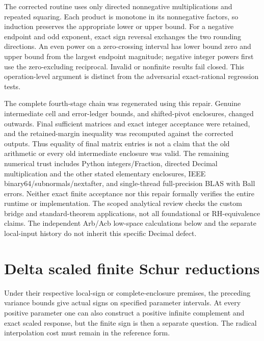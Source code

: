 \documentclass[11pt,a4paper]{article}
\numberwithin{equation}{section}
\theoremstyle{definition}\newtheorem{definition}[theorem]{Definition}
\theoremstyle{remark}\newtheorem{remark}[theorem]{Remark}
\begin{document}
The corrected routine uses only directed nonnegative multiplications
and repeated squaring. Each product is monotone in its nonnegative
factors, so induction preserves the appropriate lower or upper bound.
For a negative endpoint and odd exponent, exact sign reversal exchanges
the two rounding directions. An even power on a zero-crossing interval
has lower bound zero and upper bound from the largest endpoint magnitude;
negative integer powers first use the zero-excluding reciprocal.
Invalid or nonfinite results fail closed. This operation-level argument
is distinct from the adversarial exact-rational regression tests.

The complete fourth-stage chain was regenerated using this repair.
Genuine intermediate cell and error-ledger bounds, and shifted-pivot
enclosures, changed outwards. Final sufficient matrices and exact
integer acceptance were retained, and the retained-margin inequality
was recomputed against the corrected outputs. Thus equality of final
matrix entries is not a claim that the old arithmetic or every old
intermediate enclosure was valid. The remaining numerical trust includes
Python integers/Fraction, directed Decimal multiplication and the other
stated elementary enclosures, IEEE binary64/subnormals/nextafter, and
single-thread full-precision BLAS with Ball errors. Neither exact finite
acceptance nor this repair formally verifies the entire runtime or
implementation. The scoped analytical review checks the custom bridge
and standard-theorem applications, not all foundational or RH-equivalence
claims. The independent Arb/Acb low-space calculations below and the
separate local-input history do not inherit this specific Decimal defect.



\section{Delta scaled finite Schur reductions}\label{sec:schur-unified}
Under their respective local-sign or complete-enclosure premises, the
preceding variance bounds give actual signs on specified parameter intervals. At every positive parameter one can also construct a positive infinite complement and exact scaled response, but the finite sign is then a separate question. The radical interpolation cost must remain in the reference form.
\end{document}
